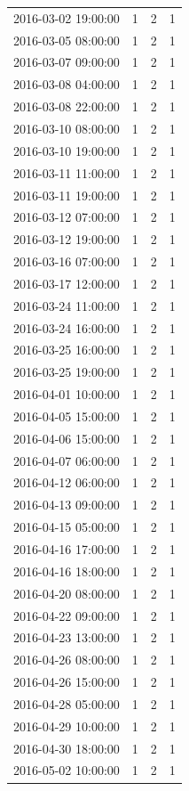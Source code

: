 \begin{tabular}{lrrr}
2016-03-02 19:00:00 & 1 & 2 & 1 \\
2016-03-05 08:00:00 & 1 & 2 & 1 \\
2016-03-07 09:00:00 & 1 & 2 & 1 \\
2016-03-08 04:00:00 & 1 & 2 & 1 \\
2016-03-08 22:00:00 & 1 & 2 & 1 \\
2016-03-10 08:00:00 & 1 & 2 & 1 \\
2016-03-10 19:00:00 & 1 & 2 & 1 \\
2016-03-11 11:00:00 & 1 & 2 & 1 \\
2016-03-11 19:00:00 & 1 & 2 & 1 \\
2016-03-12 07:00:00 & 1 & 2 & 1 \\
2016-03-12 19:00:00 & 1 & 2 & 1 \\
2016-03-16 07:00:00 & 1 & 2 & 1 \\
2016-03-17 12:00:00 & 1 & 2 & 1 \\
2016-03-24 11:00:00 & 1 & 2 & 1 \\
2016-03-24 16:00:00 & 1 & 2 & 1 \\
2016-03-25 16:00:00 & 1 & 2 & 1 \\
2016-03-25 19:00:00 & 1 & 2 & 1 \\
2016-04-01 10:00:00 & 1 & 2 & 1 \\
2016-04-05 15:00:00 & 1 & 2 & 1 \\
2016-04-06 15:00:00 & 1 & 2 & 1 \\
2016-04-07 06:00:00 & 1 & 2 & 1 \\
2016-04-12 06:00:00 & 1 & 2 & 1 \\
2016-04-13 09:00:00 & 1 & 2 & 1 \\
2016-04-15 05:00:00 & 1 & 2 & 1 \\
2016-04-16 17:00:00 & 1 & 2 & 1 \\
2016-04-16 18:00:00 & 1 & 2 & 1 \\
2016-04-20 08:00:00 & 1 & 2 & 1 \\
2016-04-22 09:00:00 & 1 & 2 & 1 \\
2016-04-23 13:00:00 & 1 & 2 & 1 \\
2016-04-26 08:00:00 & 1 & 2 & 1 \\
2016-04-26 15:00:00 & 1 & 2 & 1 \\
2016-04-28 05:00:00 & 1 & 2 & 1 \\
2016-04-29 10:00:00 & 1 & 2 & 1 \\
2016-04-30 18:00:00 & 1 & 2 & 1 \\
2016-05-02 10:00:00 & 1 & 2 & 1 \\

\end{tabular}
